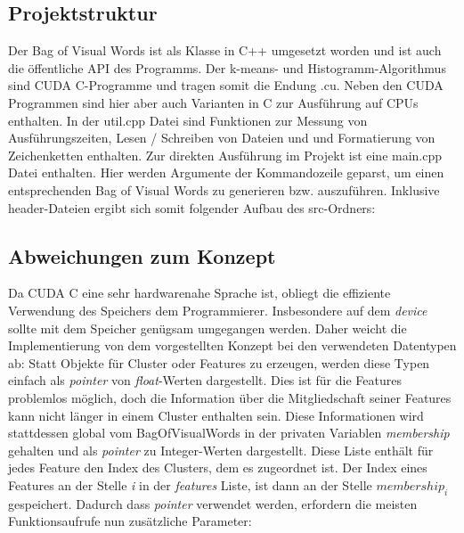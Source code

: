 \subsection{Projektstruktur}

Der Bag of Visual Words ist als Klasse in C++ umgesetzt worden und ist auch die öffentliche API des Programms. Der k-means- und Histogramm-Algorithmus sind CUDA C-Programme und tragen somit die Endung .cu. Neben den CUDA Programmen sind hier aber auch Varianten in C zur Ausführung auf CPUs enthalten. In der util.cpp Datei sind Funktionen zur Messung von Ausführungszeiten, Lesen / Schreiben von Dateien und und Formatierung von Zeichenketten enthalten. Zur direkten Ausführung im Projekt ist eine main.cpp Datei enthalten. Hier werden Argumente der Kommandozeile geparst, um einen entsprechenden Bag of Visual Words zu generieren bzw. auszuführen. Inklusive header-Dateien ergibt sich somit folgender Aufbau des src-Ordners:

\subsection{Abweichungen zum Konzept}

Da CUDA C eine sehr hardwarenahe Sprache ist, obliegt die effiziente Verwendung des Speichers dem Programmierer. Insbesondere auf dem \textit{device} sollte mit dem Speicher genügsam umgegangen werden. Daher weicht die Implementierung von dem vorgestellten Konzept bei den verwendeten Datentypen ab: Statt Objekte für Cluster oder Features zu erzeugen, werden diese Typen einfach als \textit{pointer} von \textit{float}-Werten dargestellt. Dies ist für die Features problemlos möglich, doch die Information über die Mitgliedschaft seiner Features kann nicht länger in einem Cluster enthalten sein. Diese Informationen wird stattdessen global vom BagOfVisualWords in der privaten Variablen \textit{membership} gehalten und als \textit{pointer} zu Integer-Werten dargestellt. Diese Liste enthält für jedes Feature den Index des Clusters, dem es zugeordnet ist. Der Index eines Features an der Stelle \textit{i} in der \textit{features} Liste, ist dann an der Stelle $membership_i$ gespeichert.\newline
Dadurch dass \textit{pointer} verwendet werden, erfordern die meisten Funktionsaufrufe nun zusätzliche Parameter: 

